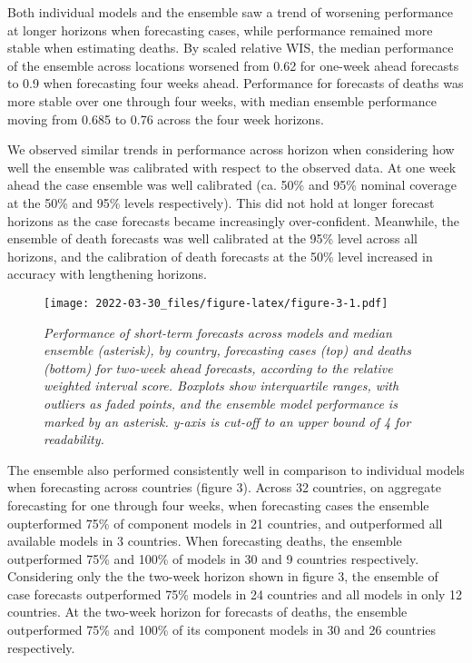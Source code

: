 \documentclass[
]{article}
\begin{document}
Both individual models and the ensemble saw a trend of worsening
performance at longer horizons when forecasting cases, while performance
remained more stable when estimating deaths. By scaled relative WIS, the
median performance of the ensemble across locations worsened from 0.62
for one-week ahead forecasts to 0.9 when forecasting four weeks ahead.
Performance for forecasts of deaths was more stable over one through
four weeks, with median ensemble performance moving from 0.685 to 0.76
across the four week horizons.

We observed similar trends in performance across horizon when
considering how well the ensemble was calibrated with respect to the
observed data. At one week ahead the case ensemble was well calibrated
(ca. 50\% and 95\% nominal coverage at the 50\% and 95\% levels
respectively). This did not hold at longer forecast horizons as the case
forecasts became increasingly over-confident. Meanwhile, the ensemble of
death forecasts was well calibrated at the 95\% level across all
horizons, and the calibration of death forecasts at the 50\% level
increased in accuracy with lengthening horizons.

\begin{figure}
\centering
\texttt{[image: 2022-03-30\_files/figure-latex/figure-3-1.pdf]}
\caption{\emph{Performance of short-term forecasts across models and
median ensemble (asterisk), by country, forecasting cases (top) and
deaths (bottom) for two-week ahead forecasts, according to the relative
weighted interval score. Boxplots show interquartile ranges, with
outliers as faded points, and the ensemble model performance is marked
by an asterisk. y-axis is cut-off to an upper bound of 4 for
readability.}}
\end{figure}

The ensemble also performed consistently well in comparison to
individual models when forecasting across countries (figure 3). Across
32 countries, on aggregate forecasting for one through four weeks, when
forecasting cases the ensemble oupterformed 75\% of component models in
21 countries, and outperformed all available models in 3 countries. When
forecasting deaths, the ensemble outperformed 75\% and 100\% of models
in 30 and 9 countries respectively. Considering only the the two-week
horizon shown in figure 3, the ensemble of case forecasts outperformed
75\% models in 24 countries and all models in only 12 countries. At the
two-week horizon for forecasts of deaths, the ensemble outperformed 75\%
and 100\% of its component models in 30 and 26 countries respectively.
\end{document}
